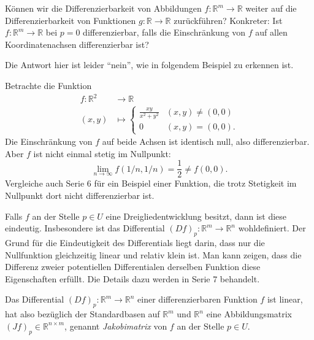 \documentclass[../main.tex]{subfiles}
\begin{document}
\begin{question}
  Können wir die Differenzierbarkeit von Abbildungen
  $f \colon \mathbb{R}^m \to \mathbb{R}$ weiter
  auf die Differenzierbarkeit von Funktionen
  $g \colon \mathbb{R} \to \mathbb{R}$ zurückführen?
  Konkreter: Ist $f \colon \mathbb{R}^m \to \mathbb{R}$
  bei $p = 0$ differenzierbar, falls die Einschränkung
  von $f$ auf allen Koordinatenachsen differenzierbar ist?
\end{question}

Die Antwort hier ist leider ``nein'', wie in folgendem
Beispiel zu erkennen ist.

\begin{example}
  Betrachte die Funktion
  \begin{align*}
    f \colon \mathbb{R}^2 & \to \mathbb{R} \\
    (x, y) & \mapsto
    \begin{cases}
      \frac{xy}{x^2 + y^2} & (x, y) \neq (0, 0) \\
      0 & (x, y) = (0, 0).
    \end{cases}
  \end{align*}
  Die Einschränkung von $f$ auf beide Achsen ist identisch null,
  also differenzierbar. Aber $f$ ist nicht einmal stetig im Nullpunkt:
  \[
    \lim_{n \to \infty} f(1/n, 1/n) = \frac{1}{2} \neq f(0, 0).
  \]
  Vergleiche auch Serie 6 für ein Beispiel einer Funktion, die
  trotz Stetigkeit im Nullpunkt dort nicht differenzierbar ist.
\end{example}

\begin{remark}
  Falls $f$ an der Stelle $p \in U$ eine
  Dreigliedentwicklung besitzt,
  dann ist diese eindeutig.
  Insbesondere ist das Differential
  ${(Df)}_p \colon \mathbb{R}^m \to \mathbb{R}^n$
  wohldefiniert.
  Der Grund für die Eindeutigkeit des Differentials
  liegt darin, dass nur die Nullfunktion
  gleichzeitig linear und relativ klein ist.
  Man kann zeigen, dass die Differenz
  zweier potentiellen Differentialen derselben Funktion
  diese Eigenschaften erfüllt.
  Die Details dazu werden in Serie 7 behandelt.
\end{remark}

\begin{definition}
  Das Differential ${(Df)}_p \colon \mathbb{R}^m \to \mathbb{R}^n$
  einer differenzierbaren Funktion $f$
  ist linear,
  hat also bezüglich der Standardbasen auf
  $\mathbb{R}^m$ und $\mathbb{R}^n$ eine
  Abbildungsmatrix ${(Jf)}_p \in \mathbb{R}^{n \times m}$,
  genannt \emph{Jakobimatrix} von $f$ an der
  Stelle $p \in U$.
\end{definition}
\end{document}

